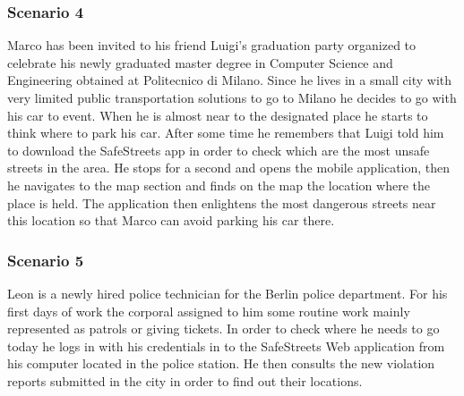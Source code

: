 \subsubsection{Scenario 4}
Marco has been invited to his friend Luigi's graduation party organized to celebrate his newly graduated master degree in Computer Science and Engineering obtained at Politecnico di Milano. Since he lives in a small city with very limited public transportation solutions to go to Milano he decides to go with his car to event. When he is almost near to the designated place he starts to think where to park his car. After some time he remembers that Luigi told him to download the SafeStreets app in order to check which are the most unsafe streets in the area. He stops for a second and opens the mobile application, then he navigates to the map section and finds on the map the location where the place is held.  The application then enlightens the most dangerous streets near this location so that Marco can avoid parking his car there.

\subsubsection{Scenario 5}
Leon is a newly hired police technician for the Berlin police department. For his first days of work the corporal assigned to him some routine work mainly represented as patrols or giving tickets. In order to check where he needs to go today he logs in with his credentials in to the SafeStreets Web application from his computer located in the police station. He then consults the new violation reports submitted in the city in order to find out their locations. 

\subsubsection{}
